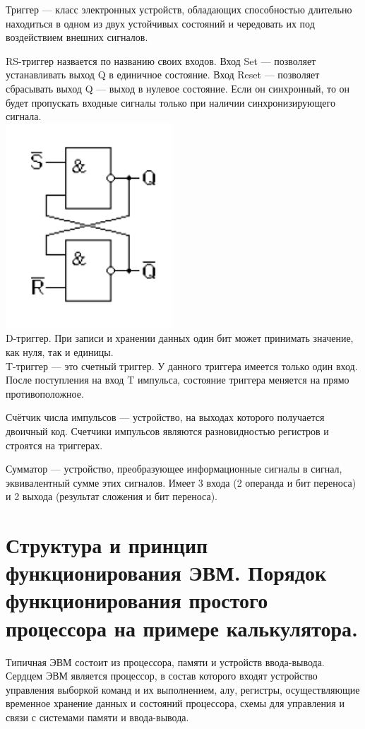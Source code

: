 \documentclass{article}
\begin{document}
Триггер — класс электронных устройств, обладающих способностью длительно находиться в одном из двух устойчивых состояний и чередовать их под воздействием внешних сигналов. 


RS-триггер назвается по названию своих входов. Вход Set — позволяет устанавливать выход Q в единичное состояние. 
Вход Reset — позволяет сбрасывать выход Q — выход в нулевое состояние. Если он синхронный, то он будет пропускать входные сигналы только при наличии синхронизирующего сигнала.
\\
\includegraphics[width=.2\textwidth]{RS1}\\


D-триггер. При записи и хранении данных один бит может принимать значение, как нуля, так и единицы.\\


T-триггер — это счетный триггер. У данного триггера имеется только один вход. После поступления на
вход T импульса, состояние триггера меняется на прямо противоположное.


Счётчик числа импульсов — устройство, на выходах которого получается двоичный код. 
Счетчики импульсов являются разновидностью регистров и строятся на триггерах.


Сумматор — устройство, преобразующее информационные сигналы в сигнал, эквивалентный сумме этих сигналов.
Имеет 3 входа (2 операнда и бит переноса) и 2 выхода (результат сложения и бит переноса).



\section{Структура и принцип функционирования ЭВМ. Порядок функционирования простого процессора на примере калькулятора.}

Типичная ЭВМ состоит из процессора, памяти и устройств ввода-вывода. Сердцем ЭВМ является процессор, в состав которого входят устройство управления выборкой команд и их выполнением, алу, 
регистры, осуществляющие временное хранение данных и состояний процессора, схемы для управления и связи с системами памяти и ввода-вывода. 
\end{document}

